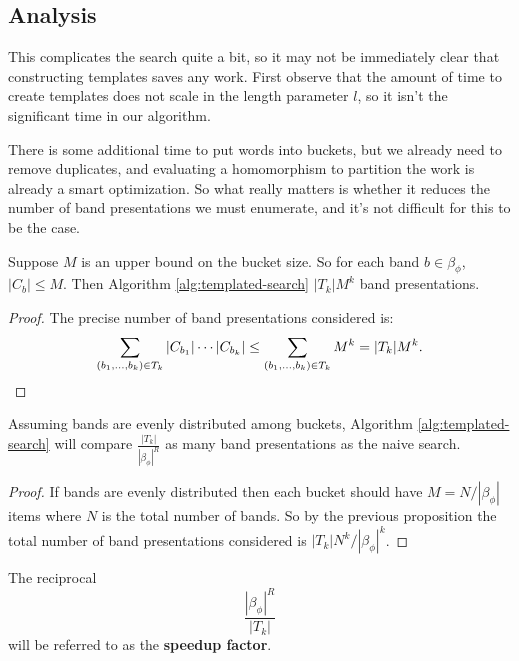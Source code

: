 \documentclass[12pt]{thesis}
\begin{document}
\subsection{Analysis}

This complicates the search quite a bit,
so it may not be immediately clear that constructing templates saves any work.
First observe that the amount of time to create
templates does not scale in the length parameter $l$,
so it isn't the significant time in our algorithm.

There is some additional time to put words into buckets,
but we already need to remove duplicates, and evaluating 
a homomorphism to partition the work is already 
a smart optimization.
So what really matters is whether it reduces
the number of band presentations we must enumerate,
and it's not difficult for this to be the case.

\begin{proposition}
    Suppose $M$ is an upper bound on the bucket size.
    So for each band $b \in \beta_{\phi}$,
    $|C_{b}| \leq M$.
    Then Algorithm \ref{alg:templated-search} $|T_{k}| M^{k}$ 
    band presentations.
\end{proposition}

\begin{proof}
    The precise number of band presentations considered is:
    \[
        \sum_{(b_{1}, \ldots, b_{k}) \in T_{k}} |C_{b_{1}}| \cdots |C_{b_{k}}|
        \leq  \sum_{(b_{1}, \ldots, b_{k}) \in T_{k}} M^{k}
        = |T_{k}|M^{k}. \qedhere
    \]
\end{proof}

\begin{corollary}
    Assuming bands are evenly distributed among buckets,
    Algorithm \ref{alg:templated-search} will compare
        $\frac{ |T_{k}| }{ |\beta_{\phi}|^{R} }$
    as many band presentations as the naive search.
\end{corollary}

\begin{proof}
    If bands are evenly distributed
    then each bucket should have $M = N/|\beta_{\phi}|$ items
    where $N$ is the total number of bands.
    So by the previous proposition
    the total number of band presentations
    considered is $|T_{k}|N^{k}/|\beta_{\phi}|^{k}$.
\end{proof}


\begin{definition}
    The reciprocal
    \begin{equation}
        \label{eq:how-many-templates}
        \frac{|\beta_{\phi}|^{R}}{|T_{k}|}
    \end{equation}
    will be referred to as the \textbf{speedup factor}.
\end{definition}
\end{document}
